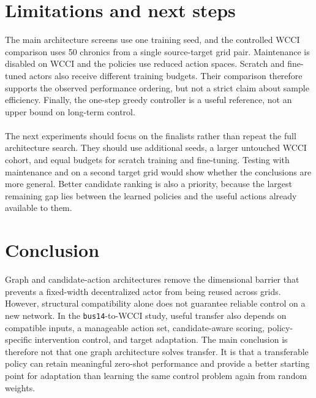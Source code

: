 \section{Limitations and next steps}

The main architecture screens use one training seed, and the controlled WCCI
comparison uses 50 chronics from a single source-target grid pair. Maintenance
is disabled on WCCI and the policies use reduced action spaces. Scratch and
fine-tuned actors also receive different training budgets. Their comparison
therefore supports the observed performance ordering, but not a strict claim
about sample efficiency. Finally, the one-step greedy controller is a useful
reference, not an upper bound on long-term control.
\\
\\
The next experiments should focus on the finalists rather than repeat the full
architecture search. They should use additional seeds, a larger untouched WCCI
cohort, and equal budgets for scratch training and fine-tuning. Testing with
maintenance and on a second target grid would show whether the conclusions are
more general. Better candidate ranking is also a priority, because the largest
remaining gap lies between the learned policies and the useful actions already
available to them.

\section{Conclusion}

Graph and candidate-action architectures remove the dimensional barrier that
prevents a fixed-width decentralized actor from being reused across grids.
However, structural compatibility alone does not guarantee reliable control
on a new network. In the \texttt{bus14}-to-WCCI study, useful transfer also
depends on compatible inputs, a manageable action set, candidate-aware
scoring, policy-specific intervention control, and target adaptation. The main
conclusion is therefore not that one graph architecture solves transfer. It is
that a transferable policy can retain meaningful zero-shot performance and
provide a better starting point for adaptation than learning the same control
problem again from random weights.

\endgroup
